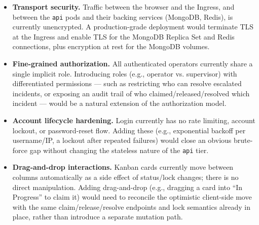 \documentclass{scrartcl}
\begin{document}
\begin{itemize}
  \item \textbf{Transport security.} Traffic between the browser and the Ingress, and between the
  \texttt{api} pods and their backing services (MongoDB, Redis), is currently unencrypted. A production-grade deployment would terminate TLS at the Ingress and enable
  TLS for the MongoDB Replica Set and Redis connections, plus encryption at rest for the MongoDB
  volumes.

  \item \textbf{Fine-grained authorization.} All authenticated operators currently share a single
  implicit role. Introducing roles (e.g., operator vs. supervisor) with differentiated permissions
  --- such as restricting who can resolve escalated incidents, or exposing an audit trail of who
  claimed/released/resolved which incident --- would be a natural extension of the authorization
  model.

  \item \textbf{Account lifecycle hardening.} Login currently has no rate limiting, account lockout,
  or password-reset flow. Adding these (e.g., exponential backoff per username/IP, a lockout after
  repeated failures) would close an obvious brute-force gap without changing the stateless nature of
  the \texttt{api} tier.

  \item \textbf{Drag-and-drop interactions.} Kanban cards currently move between columns
  automatically as a side effect of status/lock changes; there is no direct manipulation. Adding
  drag-and-drop (e.g., dragging a card into ``In Progress'' to claim it) would need to reconcile the
  optimistic client-side move with the same claim/release/resolve endpoints and lock semantics
  already in place, rather than introduce a separate mutation path.
\end{itemize}
\end{document}
